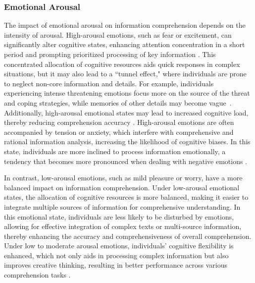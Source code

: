 \subsubsection{Emotional Arousal}
The impact of emotional arousal on information comprehension depends on the intensity of arousal. High-arousal emotions, such as fear or excitement, can significantly alter cognitive states, enhancing attention concentration in a short period and prompting prioritized processing of key information \cite{marchewka2016arousal}. This concentrated allocation of cognitive resources aids quick responses in complex situations, but it may also lead to a ``tunnel effect," where individuals are prone to neglect non-core information and details. For example, individuals experiencing intense threatening emotions focus more on the source of the threat and coping strategies, while memories of other details may become vague~\cite{mather2011arousal}.
Additionally, high-arousal emotional states may lead to increased cognitive load, thereby reducing comprehension accuracy \cite{jimenez2012emotional}. High-arousal emotions are often accompanied by tension or anxiety, which interfere with comprehensive and rational information analysis, increasing the likelihood of cognitive biases. In this state, individuals are more inclined to process information emotionally, a tendency that becomes more pronounced when dealing with negative emotions \cite{pessoa2009emotion}.

In contrast, low-arousal emotions, such as mild pleasure or worry, have a more balanced impact on information comprehension. Under low-arousal emotional states, the allocation of cognitive resources is more balanced, making it easier to integrate multiple sources of information for comprehensive understanding. In this emotional state, individuals are less likely to be disturbed by emotions, allowing for effective integration of complex texts or multi-source information, thereby enhancing the accuracy and comprehensiveness of overall comprehension. Under low to moderate arousal emotions, individuals' cognitive flexibility is enhanced, which not only aids in processing complex information but also improves creative thinking, resulting in better performance across various comprehension tasks \cite{tyng2017influences}. 

